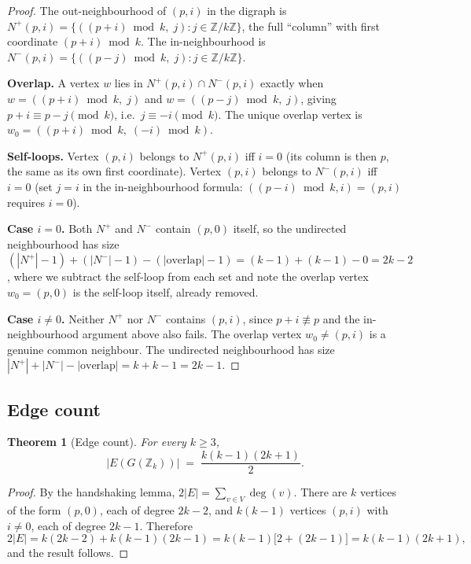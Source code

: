 \documentclass[12pt]{article}
\newtheorem{theorem}{Theorem}[section]
\theoremstyle{definition}
\theoremstyle{remark}
\newcommand{\Z}{\mathbb{Z}}
\newcommand{\Zk}{\Z/k\Z}
\newcommand{\GZk}{G(\Z_k)}
\begin{document}
\begin{proof}
The out-neighbourhood of $(p, i)$ in the digraph is
$N^+(p,i) = \{((p+i) \bmod k,\; j) : j \in \Zk\}$,
the full ``column'' with first coordinate $(p+i) \bmod k$.
The in-neighbourhood is
$N^-(p,i) = \{((p-j) \bmod k,\; j) : j \in \Zk\}$.

\smallskip\noindent
\textbf{Overlap.} A vertex $w$ lies in $N^+(p,i) \cap N^-(p,i)$ exactly
when $w = ((p+i) \bmod k,\; j)$ and $w = ((p-j) \bmod k,\; j)$, giving
$p + i \equiv p - j \pmod{k}$, i.e.\ $j \equiv -i \pmod{k}$.  The unique
overlap vertex is $w_0 = ((p+i) \bmod k,\; (-i) \bmod k)$.

\smallskip\noindent
\textbf{Self-loops.}  Vertex $(p,i)$ belongs to $N^+(p,i)$ iff $i = 0$
(its column is then $p$, the same as its own first coordinate).
Vertex $(p,i)$ belongs to $N^-(p,i)$ iff $i = 0$ (set $j = i$ in the
in-neighbourhood formula: $((p - i) \bmod k, i) = (p, i)$ requires $i = 0$).

\smallskip\noindent
\textbf{Case $i = 0$.}  Both $N^+$ and $N^-$ contain $(p, 0)$ itself,
so the undirected neighbourhood has size
$(|N^+| - 1) + (|N^-| - 1) - (|\text{overlap}| - 1) = (k-1) + (k-1) - 0 = 2k-2$,
where we subtract the self-loop from each set and note the overlap vertex
$w_0 = (p, 0)$ is the self-loop itself, already removed.

\smallskip\noindent
\textbf{Case $i \ne 0$.}  Neither $N^+$ nor $N^-$ contains $(p,i)$, since
$p + i \not\equiv p$ and the in-neighbourhood argument above also fails.
The overlap vertex $w_0 \ne (p, i)$ is a genuine common neighbour.
The undirected neighbourhood has size
$|N^+| + |N^-| - |\text{overlap}| = k + k - 1 = 2k - 1$.
\end{proof}


\subsection{Edge count}

\begin{theorem}[Edge count]
\label{thm:edges}
For every $k \ge 3$,
\[
  |E(\GZk)| \;=\; \frac{k(k-1)(2k+1)}{2}.
\]
\end{theorem}

\begin{proof}
By the handshaking lemma, $2|E| = \sum_{v \in V} \deg(v)$.
There are $k$ vertices of the form $(p, 0)$, each of degree $2k - 2$,
and $k(k-1)$ vertices $(p, i)$ with $i \ne 0$, each of degree $2k - 1$.
Therefore
\[
  2|E| = k(2k - 2) + k(k - 1)(2k - 1)
       = k(k-1)\bigl[2 + (2k - 1)\bigr]
       = k(k-1)(2k+1),
\]
and the result follows.
\end{proof}
\end{document}
